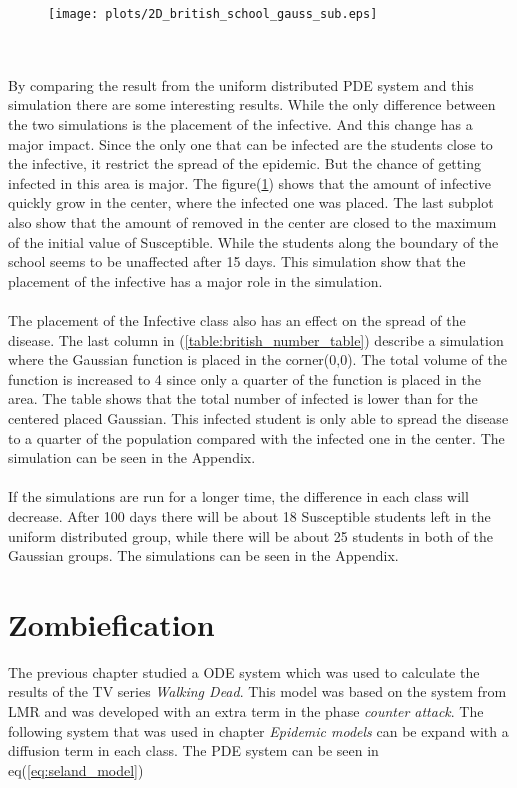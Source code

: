 \documentclass[%
twoside,                 %
final,                   %
10pt]{article}
\begin{document}
\begin{figure}[ht]
  \centerline{\texttt{[image: plots/2D\_british\_school\_gauss\_sub.eps]}}
  \caption{
  \label{fig:gauss_sub}
  }
\end{figure}


\\
\\
By comparing the result from the uniform distributed PDE system and this simulation there are some interesting results. While the only difference between the two simulations is the placement of the infective. And this change has a major impact. Since the only one that can be infected are the students close to the infective, it restrict the spread of the epidemic. But the chance of getting infected in this area is major. The figure(\ref{fig:gauss_sub}) shows that the amount of infective quickly grow in the center, where the infected one was placed. The last subplot also show  that the amount of removed in the center are closed to the maximum of the initial value of Susceptible. While the students along the boundary of the school seems to be unaffected after 15 days. This simulation show that the placement of the infective has a major role in the simulation.
\\
\\
The placement of the Infective class also has an effect on the spread of the disease. The last column in (\ref{table:british_number_table}) describe a simulation where the Gaussian function is placed in the corner(0,0). The total volume of the function is increased to 4 since only a quarter of the function is placed in the area. The table shows that the total number of infected is lower than for the centered placed Gaussian. This infected student is only able to spread the disease to a quarter of the population compared with the infected one in the center. The simulation can be seen in the Appendix.
\\
\\
If the simulations are run for a longer time, the difference in each class will decrease. After 100 days there will be about 18 Susceptible students left in the uniform distributed group, while there will be about 25 students in both of the Gaussian groups. The simulations can be seen in the Appendix.

\section{Zombiefication}
The previous chapter studied a ODE system which was used to calculate the results of the TV series \emph{Walking Dead}. This model was based on the system from LMR and was developed with an extra term in the  phase \emph{counter attack}. The following system that was used in chapter \emph{Epidemic models} can be expand with a diffusion term in each class. The PDE system can be seen in eq(\ref{eq:seland_model})  
\end{document}
